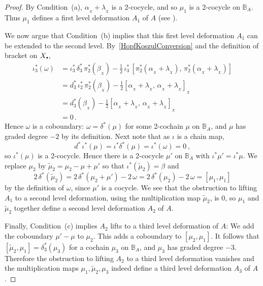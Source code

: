 \documentclass[11pt]{amsart}
\numberwithin{equation}{section}
\newcommand{\X}{_X}
\newcommand{\alphax}{\alpha_{\X}}
\newcommand{\betax}{\beta_{\X}}
\newcommand{\lambdax}{\lambda_{\X}}
\newcommand{\sd}{_{\DOT}}%
\newcommand{\BB}{\mathbb{B}} %
\newcommand{\DOT}{\setlength{\unitlength}{1.2pt}\begin{picture}(2.5,2)
               (1,1)\put(2.5,2.5){\circle*{2}}\end{picture}}
\renewcommand{\_}[1]{\mbox{$_{\left( #1 \right)}$}}
\begin{document}
{\begin{proof}
 By Condition~(a),  $\alphax+\lambdax$
is a 2-cocycle, and so $\mu_1$ is a  2-cocycle
on $\BB_A$.
Thus $\mu_1$  
defines a first level deformation $A_1$
of $A$ (see \cite{GerstenhaberSchack}).

We now argue that Condition~(b)  implies that 
this first level deformation $A_1$ can be extended to the second 
level.
By~\cref{HopfKoszulConversion} and the definition
of bracket on $X\sd$, 
$$
\begin{aligned}
  \iota^*_3(\omega)
  &= \iota^*_3 \, \delta_3^*\, \pi_2^*(\betax)
-\tfrac{1}{2}\, \iota_3^*\, [\pi^*_2(\alphax+\lambdax),\, \pi^*_2(\alphax+\lambdax)]\\
&= d_3^*\, \iota^*_2 \, \pi_2^*(\betax)
-\tfrac{1}{2}[\alphax+\lambdax,\, \alphax+\lambdax]_{\X} \\
&= d_3^*(\betax )
-\tfrac{1}{2}[\alphax+\lambdax,\, \alphax+\lambdax]_{\X}  \\
&= 0\, .
\end{aligned}
$$
Hence
$\omega$ is a coboundary:  
$\omega=\delta^*(\mu)$ for some 2-cochain $\mu$ on $\BB_A$,
and $\mu$ has graded degree $-2$ by its definition.
Next note that as $\iota$ is a chain map,
$$
d^*\, \iota^*(\mu) = \iota^* \delta^*( \mu) =\iota^*(\omega) =0\, ,
$$
so $\iota^*(\mu)$ is a 2-cocycle. 
Hence there is a 2-cocycle $\mu'$ on $\BB_A$
with $\iota^*\mu'=\iota^*\mu$.
We replace $\mu_2$ by $\tilde{\mu}_2=\mu_2-\mu+\mu'$ so that
$\iota^*(\tilde{\mu}_2)=\beta$ and 
$$2\, \delta^*(\tilde{\mu}_2)= 2\, \delta^*(\mu_2+\mu')-2\, \omega
= 2\, \delta^*(\mu_2) - 2\, \omega = [\mu_1,\mu_1] $$
by the definition of $\omega$,  
since $\mu'$ is a cocycle. 
We see that the obstruction to lifting $A_1$
to a second level deformation,
using the multiplication map $\tilde{\mu}_2$, is 0, so  
$\mu_1$ and $\tilde{\mu}_2$ together define
a second level deformation $A_2$ of $A$.

Finally, Condition~(c) implies  $A_2$ lifts
to a third level deformation of $A$: 
We add the coboundary $\mu'-\mu$ to $\mu_2$.
This adds a coboundary to $[\mu_2, \mu_1]$.
It follows that 
$[\tilde{\mu}_2, \mu_1] = \delta^*_3(\mu_3)$
for a cochain $\mu_3$ on $\BB_A$, and $\mu_3$ has 
graded degree $-3$.
Therefore the obstruction to lifting $A_2$ to a third level deformation
vanishes and the multiplication maps
$\mu_1, \tilde{\mu}_2, \mu_3$ indeed
define a third level deformation $A_3$ of $A$.


\end{proof}}
\end{document}
